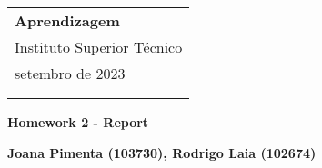 \documentclass[a4paper,12pt]{article} %
\begin{document}
\thispagestyle{empty} %

\begin{tabular}{p{15.5cm}} %
{\large \bf Aprendizagem} \\
Instituto Superior Técnico \\ setembro de 2023  \\ \\ 
\hline %
\\
\end{tabular} %

\vspace*{0.3cm} %

\begin{center} %
	{\Large \bf Homework 2 - Report} %
	\vspace{2mm}
	
	{\bf Joana Pimenta (103730), Rodrigo Laia (102674) } %
		
\end{center}  

\vspace{0.4cm}


\end{document}

